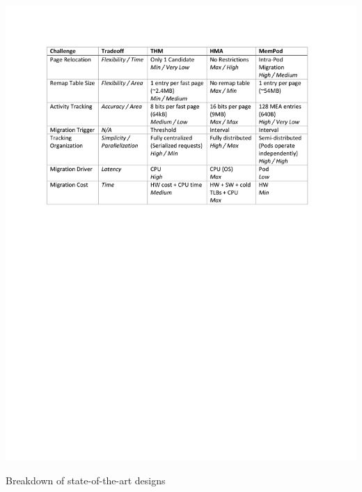 
\begin{table}
  \includegraphics[width=\linewidth]{figures/comparison_table.pdf}
  \caption{Breakdown of state-of-the-art designs}
  \label{tbl:breakdown}
\end{table}

